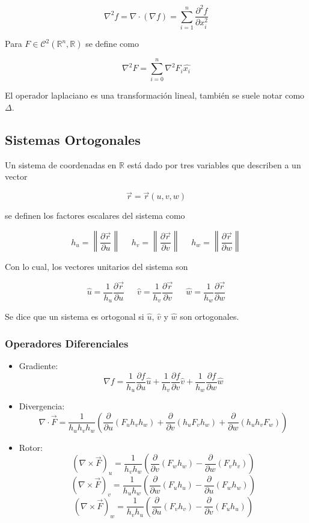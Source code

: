 \[\nabla^2 f = \nabla\cdot(\nabla f) =
\sum^n_{i=1}\frac{\partial^2f}{\partial x_i^2}\]
\bigbreak
\bigbreak

Para $F\in\mathcal{C}^2(\mathbb{R}^n, \mathbb{R})$ se define como

\[\nabla^2 F = \sum^n_{i=0}\nabla^2F_i\hat{x_i}\]
\bigbreak
\bigbreak

El operador laplaciano es una transformación lineal, también se suele notar como $\Delta$.

\subsection{Sistemas Ortogonales}

Un sistema de coordenadas en $\mathbb{R}$ está dado por tres variables que describen a un vector

\[\Vec{r} = \Vec{r}(u,v,w)\]

se definen los factores escalares del sistema como

\[h_u=\left\|\frac{\partial\Vec{r}}{\partial u}\right
\|\,\,\,\,\,\,\,\,
h_v=\left\|\frac{\partial\Vec{r}}{\partial v}\right\|\,\,\,\,\,\,\,\,
h_w=\left\|\frac{\partial\Vec{r}}{\partial w}\right\|\]

Con lo cual, los vectores unitarios del sistema son

\[\hat{u}=\frac{1}{h_u}\frac{\partial\Vec{r}}{\partial u}
\,\,\,\,\,\,\,\,\,
\hat{v}=\frac{1}{h_v}\frac{\partial\Vec{r}}{\partial v}\,\,\,\,\,\,\,\,\,
\hat{w}=\frac{1}{h_w}\frac{\partial\Vec{r}}{\partial w}\]

\bigbreak
Se dice que un sistema es ortogonal si $\hat{u}$, $\hat{v}$ y $\hat{w}$ son ortogonales.

\subsubsection{Operadores Diferenciales}

\begin{itemize}
    \item Gradiente:
    \[\nabla f =
    \frac{1}{h_u}\frac{\partial f}{\partial u}\hat{u}+
    \frac{1}{h_v}\frac{\partial f}{\partial v}\hat{v}+
    \frac{1}{h_w}\frac{\partial f}{\partial w}\hat{w}\]
    \item Divergencia:
    \[\nabla\cdot\Vec{F}=\frac{1}{h_uh_vh_w}\left(
    \frac{\partial}{\partial u}(F_uh_vh_w) +
    \frac{\partial}{\partial v}(h_uF_vh_w) +
    \frac{\partial}{\partial w}(h_uh_vF_w)\right)\]
    \item Rotor:
    \[\left(\nabla\times\Vec{F}\right)_u = \frac{1}{h_vh_w}
    \left(\frac{\partial}{\partial v}(F_wh_w)-
    \frac{\partial}{\partial w}(F_vh_v)\right)\]
    \[\left(\nabla\times\Vec{F}\right)_v = \frac{1}{h_uh_w}
    \left(\frac{\partial}{\partial w}(F_uh_u)-
    \frac{\partial}{\partial u}(F_wh_w)\right)\]
    \[\left(\nabla\times\Vec{F}\right)_w = \frac{1}{h_vh_u}
    \left(\frac{\partial}{\partial u}(F_vh_v)-
    \frac{\partial}{\partial v}(F_uh_u)\right)\]
\end{itemize}

